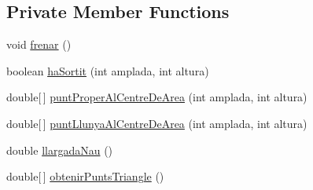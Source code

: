 \subsection*{Private Member Functions}
\begin{DoxyCompactItemize}
\item 
void \hyperlink{class_nau_abd79eb596434088da284245e34e87237}{frenar} ()
\item 
boolean \hyperlink{class_nau_ac3225453d5db00bb2e6c9ba8f410bd6e}{ha\+Sortit} (int amplada, int altura)
\item 
double\mbox{[}$\,$\mbox{]} \hyperlink{class_nau_a2f5e6461665ecc9d63adf5c77d6410b5}{punt\+Proper\+Al\+Centre\+De\+Area} (int amplada, int altura)
\item 
double\mbox{[}$\,$\mbox{]} \hyperlink{class_nau_aabe7e7191b704130b10b64ddc04a1e87}{punt\+Llunya\+Al\+Centre\+De\+Area} (int amplada, int altura)
\item 
double \hyperlink{class_nau_a00fed622eb3d4d3823e140a87e164724}{llargada\+Nau} ()
\item 
double\mbox{[}$\,$\mbox{]} \hyperlink{class_nau_ab233b5358060d6fb3985e645441043ac}{obtenir\+Punts\+Triangle} ()
\end{DoxyCompactItemize}
